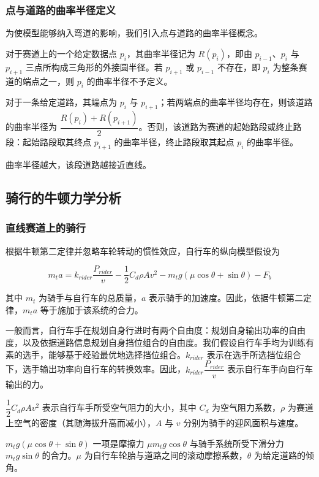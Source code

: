 \documentclass[11pt,a4paper]{ctexart}
\begin{document}
\subsubsection{点与道路的曲率半径定义}

为使模型能够纳入弯道的影响，我们引入点与道路的曲率半径概念。

对于赛道上的一个给定数据点 $p_i$，其曲率半径记为 $R(p_i)$，即由 $p_{i-1}$、$p_i$ 与 $p_{i+1}$ 三点所构成三角形的外接圆半径。若 $p_{i+1}$ 或 $p_{i-1}$ 不存在，即 $p_i$ 为整条赛道的端点之一，则 $p_i$ 的曲率半径不予定义。

对于一条给定道路，其端点为 $p_i$ 与 $p_{i+1}$；若两端点的曲率半径均存在，则该道路的曲率半径为 $\dfrac{R(p_i)+R(p_{i+1})}{2}$。否则，该道路为赛道的起始路段或终止路段：起始路段取其终点 $p_{i+1}$ 的曲率半径，终止路段取其起点 $p_i$ 的曲率半径。

曲率半径越大，该段道路越接近直线。

\subsection{骑行的牛顿力学分析}

\subsubsection{直线赛道上的骑行}

根据牛顿第二定律并忽略车轮转动的惯性效应，自行车的纵向模型假设为

\begin{equation}
m_t a=k_{rider}\frac{P_{rider}}{v}-\frac{1}{2}C_d\rho A v^2-m_t g\left(\mu\cos\theta+\sin\theta\right)-F_b
\end{equation}

其中 $m_t$ 为骑手与自行车的总质量，$a$ 表示骑手的加速度。因此，依据牛顿第二定律，$m_t a$ 等于施加于该系统的合力。

一般而言，自行车手在规划自身行进时有两个自由度：规划自身输出功率的自由度，以及依据道路信息规划自身挡位组合的自由度。我们假设自行车手均为训练有素的选手，能够基于经验最优地选择挡位组合。$k_{rider}$ 表示在选手所选挡位组合下，选手输出功率向自行车的转换效率。因此，$k_{rider}\dfrac{P_{rider}}{v}$ 表示自行车手向自行车输出的力。

$\dfrac{1}{2}C_d\rho A v^2$ 表示自行车手所受空气阻力的大小，其中 $C_d$ 为空气阻力系数，$\rho$ 为赛道上空气的密度（其随海拔升高而减小），$A$ 与 $v$ 分别为骑手的迎风面积与速度。

$m_t g\left(\mu\cos\theta+\sin\theta\right)$ 一项是摩擦力 $\mu m_t g\cos\theta$ 与骑手系统所受下滑分力 $m_t g\sin\theta$ 的合力。$\mu$ 为自行车轮胎与道路之间的滚动摩擦系数，$\theta$ 为给定道路的倾角。
\end{document}
